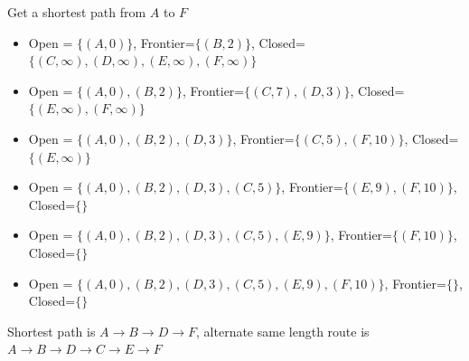 \documentclass{article}
\begin{document}
\begin{enumerate}
    Get a shortest path from $A$ to $F$

    \begin{itemize}
        \item Open = $\{(A,0)\}$, Frontier=$\{(B,2)\}$, Closed=$\{(C,\infty),(D,\infty), (E,\infty), (F,\infty)\}$
        \item Open = $\{(A,0), (B,2)\}$, Frontier=$\{(C,7),(D,3)\}$, Closed=$\{(E,\infty),(F,\infty)\}$
        \item Open = $\{(A,0), (B,2), (D,3)\}$, Frontier=$\{(C,5),(F,10)\}$, Closed=$\{(E,\infty)\}$
        \item Open = $\{(A,0), (B,2), (D,3), (C,5)\}$, Frontier=$\{(E,9),(F,10)\}$, Closed=$\{\}$
        \item Open = $\{(A,0), (B,2), (D,3), (C,5), (E,9)\}$, Frontier=$\{(F,10)\}$, Closed=$\{\}$
        \item Open = $\{(A,0), (B,2), (D,3), (C,5), (E,9), (F,10)\}$, Frontier=$\{\}$, Closed=$\{\}$
    \end{itemize}
    Shortest path is $A \rightarrow B \rightarrow D \rightarrow F$, alternate same length route is $A \rightarrow B \rightarrow D \rightarrow C \rightarrow E \rightarrow F$
\end{enumerate}
\end{document}

